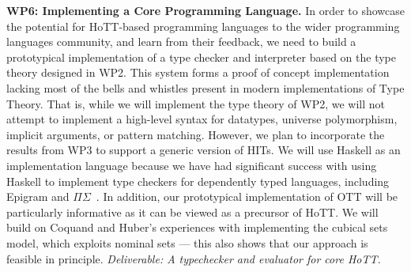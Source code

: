 \documentclass[a4paper,11pt]{article}
\begin{document}
{\bf WP6: Implementing a Core Programming Language.} In order to showcase
the potential for HoTT-based programming languages to the wider
programming languages community, and learn from their feedback, we
need to build a prototypical implementation of a type checker and
interpreter based on the type theory designed in WP2.  This system
forms a proof of concept implementation lacking most of the bells
and whistles present in modern implementations of Type Theory. That
is, while we will implement the type theory of WP2, we will not
attempt to implement a high-level syntax for datatypes, universe
polymorphism, implicit arguments, or pattern matching. However, we plan
to incorporate the results from WP3 to support a generic version of
HITs. We will use Haskell as an implementation language because
we have had significant success with using Haskell to implement type
checkers for dependently typed languages, including Epigram and
$\Pi\Sigma$~\cite{alti:checking,easy,alti:pisigma-new}.
In addition, our prototypical implementation of OTT will be
particularly informative as it can be viewed as a precursor of HoTT.
%
We will build on Coquand and Huber's experiences with implementing the
cubical sets model, which exploits nominal sets \cite{nominal}--- this also shows that our approach is feasible in
principle.  {\em Deliverable: A typechecker and evaluator for core
  HoTT. 
}


\end{document}
